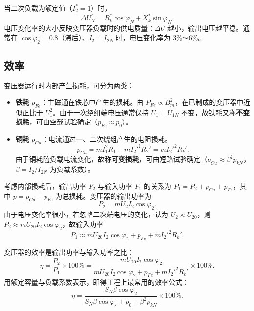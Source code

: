 当二次负载为额定值（$I_2^{*}=1$）时，
\begin{equation}
\Delta U_N^{*}=R_k^{*}\cos\varphi_N+X_k^{*}\sin\varphi_N .
\end{equation}
电压变化率的大小反映变压器负载时的供电质量：$\Delta U$ 越小，输出电压越平稳。通常在 $\cos\varphi_2=0.8$（滞后）、$I_2=I_{2N}$ 时，电压变化率为 3\%～6\%。

\subsection{效率}
变压器运行时内部产生损耗，可分为两类：
\begin{itemize}
  \item \textbf{铁耗} $p_{Fe}$：主磁通在铁芯中产生的损耗。由 $P_{Fe}\propto B_m^2$，在已制成的变压器中近似正比于 $U_1^2$。由于一次绕组端电压通常保持 $U_1=U_{1N}$ 不变，故铁耗又称\textbf{不变损耗}，可由空载试验确定（$p_{Fe}\approx p_0$）。
  \item \textbf{铜耗} $p_{Cu}$：电流通过一、二次绕组产生的电阻损耗。
  \begin{equation}
  p_{Cu}=mI_1^{2}R_1+mI_2'^{2}R_2'=mI_2'^{2}R_k' .
  \end{equation}
  由于铜耗随负载电流变化，故称\textbf{可变损耗}，可由短路试验确定（$p_{Cu}\approx\beta^2p_{kN}$，$\beta=I_2/I_{2N}$ 为负载系数）。
\end{itemize}

考虑内部损耗后，输出功率 $P_2$ 与输入功率 $P_1$ 的关系为 $P_1=P_2+p_{Cu}+p_{Fe}$，其中 $p=p_{Cu}+p_{Fe}$ 为总损耗。变压器的输出功率为
\begin{equation}
P_2=mU_2I_2\cos\varphi_2 .
\end{equation}
由于电压变化率很小，若忽略二次端电压的变化，认为 $U_2\approx U_{20}$，则 $P_2\approx mU_{20}I_2\cos\varphi_2$，故输入功率
\begin{equation}
P_1\approx mU_{20}I_2\cos\varphi_2+p_{Fe}+mI_2'^{2}R_k' .
\end{equation}

变压器的效率是输出功率与输入功率之比：
\begin{equation}
\eta=\frac{P_2}{P_1}\times100\%=\frac{mU_{20}I_2\cos\varphi_2}{mU_{20}I_2\cos\varphi_2+p_{Fe}+mI_2'^{2}R_k'}\times100\% .
\end{equation}
用额定容量与负载系数表示，即得工程上最常用的效率公式：
\begin{equation}
\eta=\frac{S_N\beta\cos\varphi_2}{S_N\beta\cos\varphi_2+p_0+\beta^{2}p_{kN}}\times100\% .
\end{equation}

